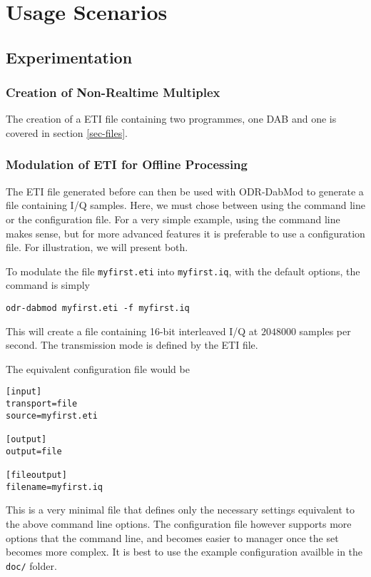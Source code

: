 \section{Usage Scenarios}
\subsection{Experimentation}
\subsubsection{Creation of Non-Realtime Multiplex}
The creation of a ETI file containing two programmes, one DAB and one \dabplus{} is covered in
section \ref{sec-files}.

\subsubsection{Modulation of ETI for Offline Processing}
The ETI file generated before can then be used with ODR-DabMod to generate a file containing I/Q
samples. Here, we must chose between using the command line or the configuration file. For a very
simple example, using the command line makes sense, but for more advanced features it is preferable
to use a configuration file. For illustration, we will present both.

To modulate the file \texttt{myfirst.eti} into \texttt{myfirst.iq}, with the default options, the
command is simply

\begin{lstlisting}
odr-dabmod myfirst.eti -f myfirst.iq
\end{lstlisting}

This will create a file containing 16-bit interleaved I/Q at $2048000$ samples per second. The
transmission mode is defined by the ETI file.

The equivalent configuration file would be
\begin{lstlisting}
[input]
transport=file
source=myfirst.eti

[output]
output=file

[fileoutput]
filename=myfirst.iq
\end{lstlisting}

This is a very minimal file that defines only the necessary settings equivalent to the above command
line options. The configuration file however supports more options that the command line, and
becomes easier to manager once the set becomes more complex. It is best to use the example
configuration availble in the \texttt{doc/} folder.

